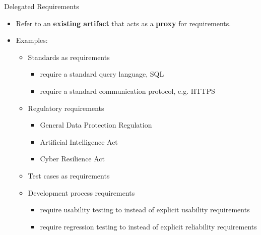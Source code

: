\begin{Slide}{Delegated Requirements}
\begin{itemize}
\item Refer to an \textbf{existing artifact} that acts as a \textbf{proxy} for requirements.
\item Examples:
\begin{itemize}
\item Standards as requirements
\begin{itemize}
\item require a standard query language, SQL
\item require a standard communication protocol, e.g. HTTPS
\end{itemize}
\item Regulatory requirements
\begin{itemize}
\item General Data Protection Regulation
\item Artificial Intelligence Act
\item Cyber Resilience Act 
\end{itemize}
\item Test cases as requirements
\item Development process requirements
\begin{itemize}
\item require usability testing to instead of explicit usability requirements
\item require regression testing to instead of explicit reliability requirements

\end{itemize}
\end{itemize}
\end{itemize}
\end{Slide}
